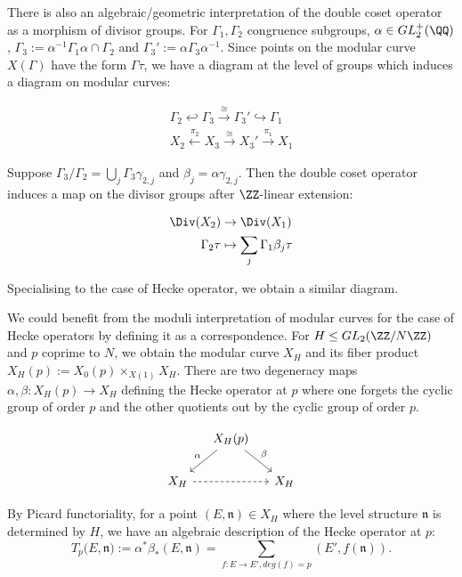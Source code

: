 There is also an algebraic/geometric interpretation of the double coset operator as a morphism of divisor groups. For $\Gamma_1, \Gamma_2$ congruence subgroups, $\alpha \in GL_2^+(\QQ) $, $\Gamma_3 := \alpha^{-1} \Gamma_1 \alpha \cap \Gamma_2$ and $\Gamma_3' := \alpha \Gamma_3 \alpha^{-1}$. Since points on the modular curve $X(\Gamma)$ have the form $\Gamma \tau$, we have a diagram at the level of groups which induces a diagram on modular curves:


\begin{align*}
\Gamma_2 \hookleftarrow \Gamma_3 \xrightarrow{\cong} \Gamma_3' \hookrightarrow \Gamma_1 \\
X_2 \xleftarrow{\pi_2} X_3 \xrightarrow{\cong} X_3' \xrightarrow{\pi_1} X_1
\end{align*}

Suppose $\Gamma_3 / \Gamma_2 = \bigcup_j \Gamma_3 \gamma_{2,j}$ and $\beta_j = \alpha \gamma_{2,j}$. Then the double coset operator induces a map on the divisor groups  after $\ZZ$-linear extension:

\begin{align*}
    \Div(X_2) &\rightarrow \Div(X_1) \\
    \Gamma_2 \tau &\mapsto \sum_j \Gamma_1 \beta_j \tau
\end{align*}

Specialising to the case of Hecke operator, we obtain a similar diagram. 

We could benefit from the moduli interpretation of modular curves for the case of Hecke operators by defining it as a correspondence. For $H \leq GL_2(\ZZ/N\ZZ)$ and $p$ coprime to $N$, we obtain the modular curve $X_H$ and its fiber product $X_H(p) := X_0(p) \times_{X(1)} X_H$. There are two degeneracy maps $\alpha,\beta: X_H(p) \rightarrow X_H$ defining the Hecke operator at $p$ where one forgets the cyclic group of order $p$ and the other quotients out by the cyclic group of order $p$.


\[
\begin{tikzcd}[column sep=small]
 & X_H(p) \arrow{dl}[swap]{\alpha} \arrow{dr}{\beta} & \\
X_H \arrow[rr,dashed] & & X_H
\end{tikzcd}
\]

By Picard functoriality, for a point $(E,\mathfrak{n}) \in X_H$ where the level structure $\mathfrak{n}$ is determined by $H$, we have an algebraic description of the Hecke operator at $p$: \[T_p(E,\mathfrak{n)} := \alpha^* \beta_* (E,\mathfrak{n}) = \sum_{f:E\rightarrow E', deg(f) = p} (E',f(\mathfrak{n})).\]


